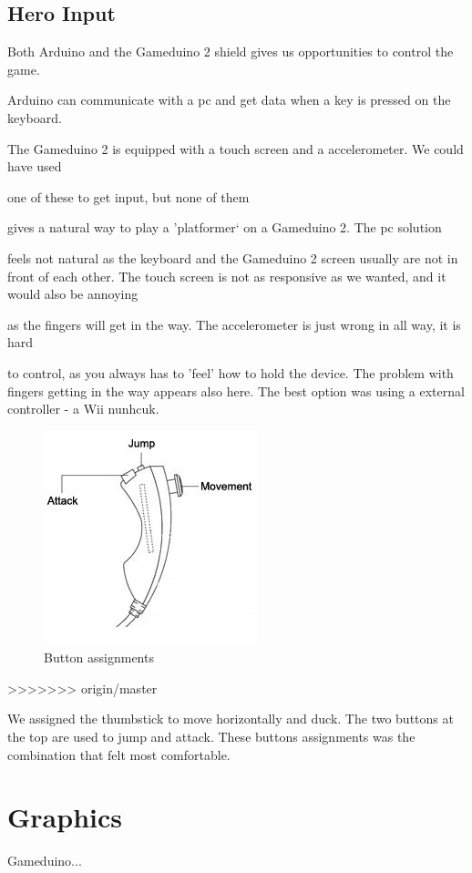 \subsection{Hero Input}
Both Arduino and the Gameduino 2 shield gives us opportunities to control the game.

Arduino can communicate with a pc and get data when a key is pressed on the keyboard.

The Gameduino 2 is equipped with a touch screen and a accelerometer. We could have used

one of these to get input, but none of them

gives a natural way to play a 'platformer` on a Gameduino 2. The pc solution

feels not natural as the keyboard and the Gameduino 2 screen usually are not in front of each other. The touch screen is not as responsive as we wanted, and it would also be annoying

as the fingers will get in the way. The accelerometer is just wrong in all way, it is hard

to control, as you always has to 'feel' how to hold the device. The problem with fingers
getting in the way appears also here. The best option was using a external controller - a Wii nunhcuk.

\begin{figure}[h] 
  \centering 
  \includegraphics[scale=0.6]{Figures/nunchuk}
  \caption{Button assignments}
  \label{fig:Nunchuk} 
\end{figure}
>>>>>>> origin/master

We assigned the thumbstick to move horizontally and duck. The two buttons at the top are used to jump
and attack. These buttons assignments was the combination that felt most comfortable.

\section{Graphics}
Gameduino...

